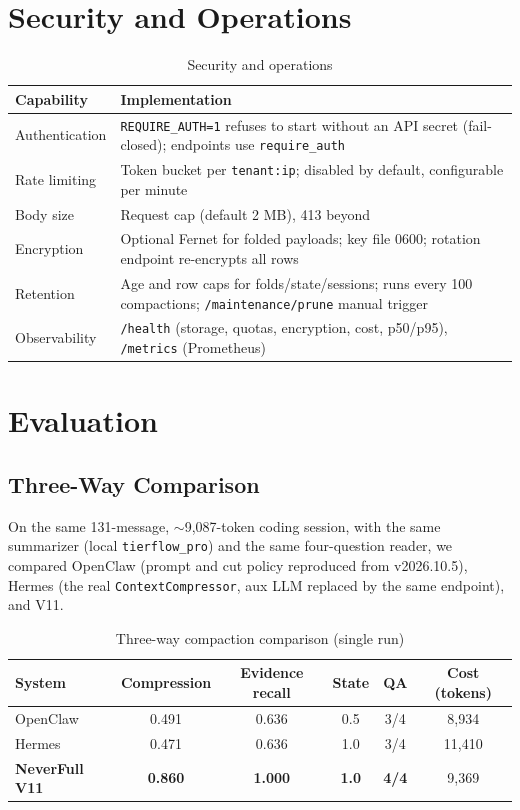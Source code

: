\documentclass[11pt,a4paper]{article}
\begin{document}
\section{Security and Operations}

\begin{table}[htbp]
\centering
\caption{Security and operations}
\begin{tabularx}{\linewidth}{lX}
\toprule
Capability & Implementation \\
\midrule
Authentication & \texttt{REQUIRE\_AUTH=1} refuses to start without an API secret (fail-closed); endpoints use \texttt{require\_auth} \\
Rate limiting & Token bucket per \texttt{tenant:ip}; disabled by default, configurable per minute \\
Body size & Request cap (default 2 MB), 413 beyond \\
Encryption & Optional Fernet for folded payloads; key file 0600; rotation endpoint re-encrypts all rows \\
Retention & Age and row caps for folds/state/sessions; runs every 100 compactions; \texttt{/maintenance/prune} manual trigger \\
Observability & \texttt{/health} (storage, quotas, encryption, cost, p50/p95), \texttt{/metrics} (Prometheus) \\
\bottomrule
\end{tabularx}
\end{table}

\section{Evaluation}

\subsection{Three-Way Comparison}
On the same 131-message, $\sim$9,087-token coding session, with the same summarizer (local \texttt{tierflow\_pro}) and the same four-question reader, we compared OpenClaw (prompt and cut policy reproduced from v2026.10.5), Hermes (the real \texttt{ContextCompressor}, aux LLM replaced by the same endpoint), and V11.

\begin{table}[htbp]
\centering
\caption{Three-way compaction comparison (single run)}
\begin{tabular}{lccccc}
\toprule
System & Compression & Evidence recall & State & QA & Cost (tokens) \\
\midrule
OpenClaw & 0.491 & 0.636 & 0.5 & 3/4 & 8,934 \\
Hermes & 0.471 & 0.636 & 1.0 & 3/4 & 11,410 \\
\textbf{NeverFull V11} & \textbf{0.860} & \textbf{1.000} & \textbf{1.0} & \textbf{4/4} & 9,369 \\
\bottomrule
\end{tabular}
\end{table}
\end{document}
